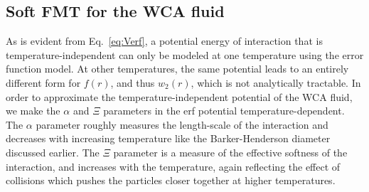 \documentclass[letterpaper,twocolumn,amsmath,amssymb,prb]{revtex4-1}
\begin{document}
\subsection{Soft FMT for the WCA fluid}





As is evident from Eq.~\ref{eq:Verf}, a potential energy of interaction 
that is temperature-independent can only be modeled at one temperature 
using the error function model.
At other temperatures, the same potential leads
to an entirely different form for $f(r)$, and thus $w_2(r)$, which is not
analytically tractable. 
In order to approximate the temperature-independent potential of the WCA 
fluid, we make the $\alpha$ and $\Xi$ parameters in the erf potential 
temperature-dependent.
The $\alpha$ parameter roughly measures the length-scale of the
interaction and decreases with increasing temperature 
like the Barker-Henderson diameter 
discussed earlier. 
The $\Xi$ parameter is a measure of the effective softness of the 
interaction, and increases with the temperature, again reflecting the
effect of collisions which pushes the particles
closer together at higher temperatures.
\end{document}
